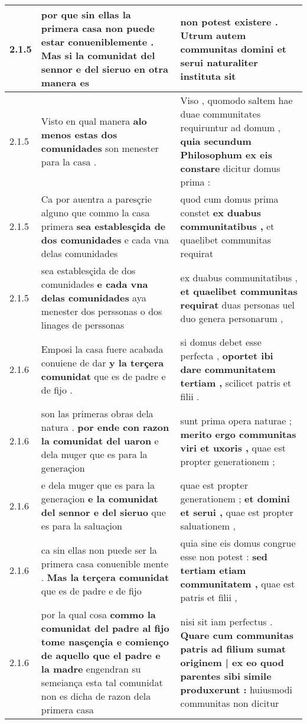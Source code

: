 \begin{tabular}{|p{1cm}|p{6.5cm}|p{6.5cm}|}
2.1.5 & por que sin ellas la primera casa non puede estar conueniblemente . \textbf{ Mas si la comunidat del sennor e del sieruo } en otra manera es & non potest existere . \textbf{ Utrum autem communitas domini } et serui naturaliter instituta sit \\\hline
2.1.5 & Visto en qual manera \textbf{ alo menos estas dos comunidades } son menester para la casa . & Viso , quomodo saltem hae duae communitates requiruntur ad domum , \textbf{ quia secundum Philosophum ex eis constare } dicitur domus prima : \\\hline
2.1.5 & Ca por auentra a paresçrie alguno que commo la casa primera \textbf{ sea establesçida de dos comunidades } e cada vna delas comunidades & quod cum domus prima constet \textbf{ ex duabus communitatibus , } et quaelibet communitas requirat \\\hline
2.1.5 & sea establesçida de dos comunidades \textbf{ e cada vna delas comunidades } aya menester dos perssonas o dos linages de perssonas & ex duabus communitatibus , \textbf{ et quaelibet communitas requirat } duas personas uel duo genera personarum , \\\hline
2.1.6 & Emposi la casa fuere acabada conuiene de dar \textbf{ y la terçera comunidat } que es de padre e de fijo . & si domus debet esse perfecta , \textbf{ oportet ibi dare communitatem tertiam , } scilicet patris et filii . \\\hline
2.1.6 & son las primeras obras dela natura . \textbf{ por ende con razon la comunidat del uaron } e dela muger que es para la generaçion & sunt prima opera naturae ; \textbf{ merito ergo communitas viri et uxoris , } quae est propter generationem ; \\\hline
2.1.6 & e dela muger que es para la generaçion \textbf{ e la comunidat del sennor e del sieruo } que es para la saluaçion & quae est propter generationem ; \textbf{ et domini et serui , } quae est propter saluationem , \\\hline
2.1.6 & ca sin ellas non puede ser la primera casa conuenible mente . \textbf{ Mas la terçera comunidat } que es de padre e de fijo & quia sine eis domus congrue esse non potest : \textbf{ sed tertiam etiam communitatem , } quae est patris et filii , \\\hline
2.1.6 & por la qual cosa \textbf{ commo la comunidat del padre al fijo tome nasçençia e comienço de aquello que el padre e la madre } engendran su semeiança esta tal comunidat non es dicha de razon dela primera casa & nisi sit iam perfectus . \textbf{ Quare cum communitas patris ad filium sumat originem | ex eo quod parentes sibi simile produxerunt : } huiusmodi communitas non dicitur \\\hline

\end{tabular}
